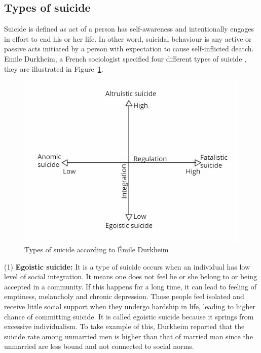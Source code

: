 \subsection*{Types of suicide}
Suicide is defined as act of a person has self-awareness and intentionally engages in effort to end his or her life. In other word, suicidal behaviour is any active or passive acts initiated by a person with expectation to cause self-inflicted deatch. Emile Durkheim, a French sociologist specified four different types of suicide \cite{Durkheim1897}, they are illustrated in Figure~\ref{fig:types_of_suicide}.\\
\begin{figure}[!ht]
\centering
\includegraphics[width=\textwidth, clip=true]{img/type_suicide}
\caption[Types of suicide]{Types of suicide according to Émile Durkheim} 
\label{fig:types_of_suicide}
\end{figure}
(1) \textbf{Egoistic suicide:} It is a type of suicide occurs when an individual has low level of social integration. It means one does not feel he or she belong to or being accepted in a community. If this happens for a long time, it can lead to feeling of emptiness, melancholy and chronic depression. Those people feel isolated and receive little social support when they undergo hardship in life, leading to higher chance of committing suicide. It is called egoistic suicide because it springs from excessive individualism. To take example of this, Durkheim reported that the suicide rate among unmarried men is higher than that of married man since the unmarried are less bound and not connected to social norms.\\
